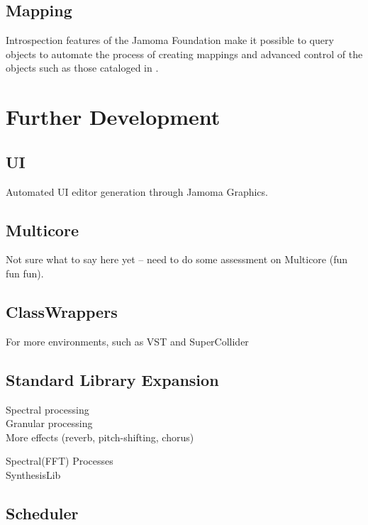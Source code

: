 \documentclass[twoside,10pt]{article}
\begin{document}
\subsection{Mapping}

Introspection features of the Jamoma Foundation make it possible to query objects to automate the process of creating mappings and advanced control of the objects such as those cataloged in \cite{Pendharkar:2006}.  




\section{Further Development} %

\subsection{UI}

Automated UI editor generation through Jamoma Graphics.

\subsection{Multicore}

Not sure what to say here yet -- need to do some assessment on Multicore (fun fun fun).

\subsection{ClassWrappers}

For more environments, such as VST and SuperCollider

\subsection{Standard Library Expansion}

Spectral processing \\

Granular processing   \\

More effects (reverb, pitch-shifting, chorus) 


Spectral(FFT) Processes\\

SynthesisLib

\subsection{Scheduler}
\end{document}
